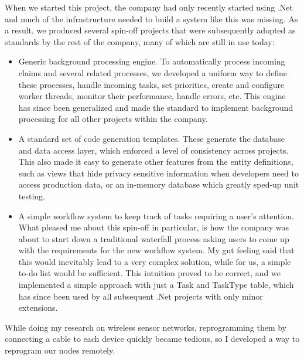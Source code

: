 \documentclass[10pt,a4paper]{../altacv}
\begin{document}
\begin{fullwidth}
\medskip\medskip

When we started this project, the company had only recently started using .Net and much of the infrastructure needed to build a system like this was missing. As a result, we produced several spin-off projects that were subsequently adopted as standards by the rest of the company, many of which are still in use today:

\medskip\medskip

\begin{itemize}
	\item\small Generic background processing engine. To automatically process incoming claims and several related processes, we developed a uniform way to define these processes, handle incoming tasks, set priorities, create and configure worker threads, monitor their performance, handle errors, etc. This engine has since been generalized and made the standard to implement background processing for all other projects within the company.
	\item\small A standard set of code generation templates. These generate the database and data access layer, which enforced a level of consistency across projects. This also made it easy to generate other features from the entity definitions, such as views that hide privacy sensitive information when developers need to access production data, or an in-memory database which greatly sped-up unit testing.
	\item\small A simple workflow system to keep track of tasks requiring a user's attention. What pleased me about this spin-off in particular, is how the company was about to start down a traditional waterfall process asking users to come up with the requirements for the new workflow system. My gut feeling said that this would inevitably lead to a very complex solution, while for us, a simple to-do list would be sufficient. This intuition proved to be correct, and we implemented a simple approach with just a Task and TaskType table, which has since been used by all subsequent .Net projects with only minor extensions.
\end{itemize}

\bigskip\bigskip

While doing my research on wireless sensor networks, reprogramming them by connecting a cable to each device quickly became tedious, so I developed a way to reprogram our nodes remotely.

\medskip\medskip


\end{fullwidth}
\end{document}
